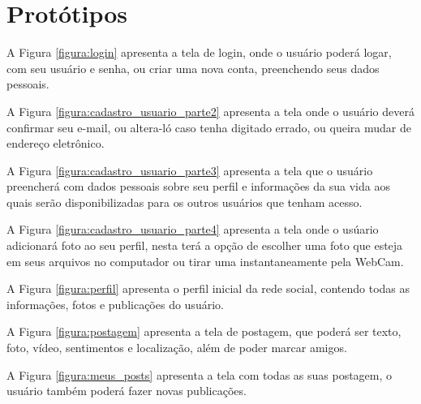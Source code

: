 \chapter{Protótipos}

A Figura \ref{figura:login} apresenta a tela de login, onde o usuário poderá logar, com seu usuário e senha, ou criar uma nova conta, preenchendo seus dados pessoais.


A Figura \ref{figura:cadastro_usuario_parte2} apresenta a tela onde o usuário deverá confirmar seu e-mail, ou altera-ló caso tenha digitado errado, ou queira mudar de endereço eletrônico.


A Figura \ref{figura:cadastro_usuario_parte3} apresenta a tela que o usuário preencherá com dados pessoais sobre seu perfil e informações da sua vida aos quais serão disponibilizadas para os outros usuários que tenham acesso.


A Figura \ref{figura:cadastro_usuario_parte4} apresenta a tela onde o usúario adicionará foto ao seu perfil, nesta terá a opção de escolher uma foto que esteja em seus arquivos no computador ou tirar uma instantaneamente pela WebCam.


A Figura \ref{figura:perfil} apresenta o perfil inicial da rede social, contendo todas as informações, fotos e publicações do usuário.


A Figura \ref{figura:postagem} apresenta a tela de postagem, que poderá ser texto, foto, vídeo, sentimentos e localização, além de poder marcar amigos.


A Figura \ref{figura:meus_posts} apresenta a tela com todas as suas postagem, o usuário também poderá fazer novas publicações.

